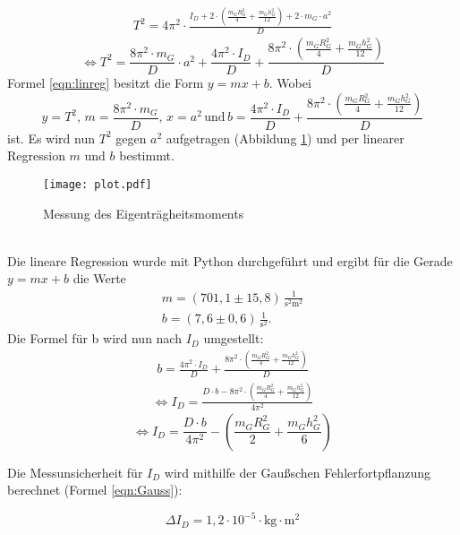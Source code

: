 \begin{align*}
  T^2 = 4\pi^2 \cdot \frac{I_D + 2 \cdot \left(\frac{m_G R_G^2}{4} + \frac{m_G h_G^2}{12} \right) + 2 \cdot m_G \cdot a^2}{D}
\end{align*}
\begin{equation}
  \label{eqn:linreg}
  \Leftrightarrow T^2 = \frac{8\pi^2 \cdot m_G}{D}\cdot a^2 + \frac{4\pi^2 \cdot I_D}{D}  + \frac{8\pi^2 \cdot \left(\frac{m_G R_G^2}{4} + \frac{m_G h_G^2}{12} \right)}{D}
\end{equation}
Formel \ref{eqn:linreg} besitzt die Form $y = mx + b$. Wobei 
\begin{equation*}
  y = T^2,\, m = \frac{8\pi^2 \cdot m_G}{D},\, x = a^2 \, \mathrm{und}\, b = \frac{4\pi^2 \cdot I_D}{D}  + \frac{8\pi^2 \cdot \left(\frac{m_G R_G^2}{4} + \frac{m_G h_G^2}{12} \right)}{D}
\end{equation*}
ist. Es wird nun $T^2$ gegen $a^2$ aufgetragen (Abbildung \ref{fig:plot}) und per linearer Regression $m$ und $b$ bestimmt.
 \begin{figure}
   \centering
   \texttt{[image: plot.pdf]}
   \caption{Messung des Eigenträgheitsmoments}
   \label{fig:plot}
 \end{figure}
\\
Die lineare Regression wurde mit Python durchgeführt und ergibt für die Gerade $y = mx + b$ die Werte
\begin{align*}
  m = (701{,}1 \pm 15{,}8)\, \frac{1}{\mathrm{s^2 m^2}} \\
  b = (7{,}6 \pm 0{,}6)\, \frac{1}{\mathrm{s^2}} .
\end{align*}
Die Formel für b wird nun nach $I_D$ umgestellt:
\begin{align*}
  b = \frac{4\pi^2 \cdot I_D}{D}  + \frac{8\pi^2 \cdot \left(\frac{m_G R_G^2}{4} + \frac{m_G h_G^2}{12} \right)}{D}
\end{align*}
\begin{align*}
  \Leftrightarrow I_D = \frac{D \cdot b - 8\pi^2 \cdot \left(\frac{m_G R_G^2}{4} + \frac{m_G h_G^2}{12} \right)}{4\pi^2}
\end{align*}
\begin{equation}
  \label{eqn:I_D}
  \Leftrightarrow I_D = \frac{D \cdot b}{4\pi^2} - \left(\frac{m_G R_G^2}{2} + \frac{m_G h_G^2}{6} \right)
\end{equation}

Die Messunsicherheit für $I_D$ wird mithilfe der Gaußschen Fehlerfortpflanzung berechnet (Formel \ref{eqn:Gauss}):

\begin{equation}
  \Delta I_D = 1,2 \cdot 10^{-5} \cdot \mathrm{kg \cdot m^2}
\end{equation}

